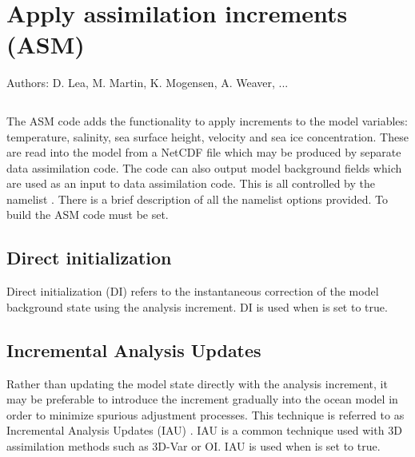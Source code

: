 \documentclass[NEMO_book]{subfiles}
\begin{document}
\chapter{Apply assimilation increments (ASM)}
\label{ASM}

Authors: D. Lea,  M. Martin, K. Mogensen, A. Weaver, ...   %

\minitoc


\newpage
$\ $\newline    %

The ASM code adds the functionality to apply increments to the model variables: 
temperature, salinity, sea surface height, velocity and sea ice concentration. 
These are read into the model from a NetCDF file which may be produced by separate data
assimilation code.  The code can also output model background fields which are used
as an input to data assimilation code. This is all controlled by the namelist
\textit{ }.  There is a brief description of all the namelist options
provided.  To build the ASM code  must be set.


\section{Direct initialization}
\label{ASM_DI}

Direct initialization (DI) refers to the instantaneous correction
of the model background state using the analysis increment.
DI is used when  is set to true.

\section{Incremental Analysis Updates}
\label{ASM_IAU}

Rather than updating the model state directly with the analysis increment,
it may be preferable to introduce the increment gradually into the ocean
model in order to minimize spurious adjustment processes. This technique
is referred to as Incremental Analysis Updates (IAU) \citep{Bloom_al_MWR96}.
IAU is a common technique used with 3D assimilation methods such as 3D-Var or OI.
IAU is used when  is set to true.
\end{document}
